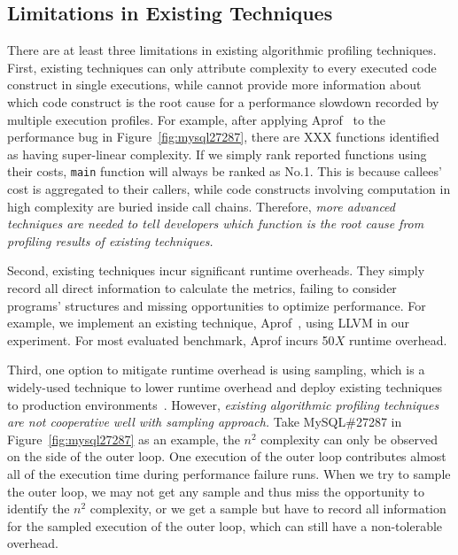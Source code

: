 \subsection{Limitations in Existing Techniques}
\label{subsec:existing}


%
There are at least three limitations in existing algorithmic profiling techniques. 
%
First, existing techniques can only 
attribute complexity to every executed code construct
in single executions, 
while cannot provide more information about 
which code construct is the root cause 
for a performance slowdown recorded by multiple 
execution profiles. 
For example, after applying Aprof~\cite{Aprof1,Aprof2} 
to the performance bug in Figure~\ref{fig:mysql27287}, 
there are {\color{red} XXX} functions identified 
as having super-linear complexity. 
If we simply rank reported functions using their costs, 
\texttt{main} function will always be ranked as No.1. 
This is because callees' cost is aggregated to their callers, 
while code constructs involving computation in high complexity 
are buried inside call chains.
Therefore, \emph{
more advanced techniques are needed to tell developers 
which function is the root cause from profiling results of existing techniques. 
}


Second, existing techniques incur significant runtime overheads. 
They simply record all direct information to calculate the metrics, 
failing to consider programs' structures and missing opportunities to optimize performance.
For example, we implement an existing technique, Aprof~\cite{Aprof1,Aprof2}, 
using LLVM in our experiment. 
For most evaluated benchmark, Aprof incurs 50$X$ runtime overhead.


Third, one option to mitigate runtime overhead is using
sampling, which is a widely-used technique to lower runtime overhead 
and deploy existing techniques to production 
environments~\cite{SongOOPSLA2014,liblit03,liblit05,CCI}. 
However, \emph{existing algorithmic profiling techniques are not cooperative well with
sampling approach.} 
Take MySQL\#27287 in Figure~\ref{fig:mysql27287} as an example,
the $n^2$ complexity can only be observed on the side of the outer loop. 
One execution of the outer loop contributes almost all of 
the execution time during performance failure runs. 
When we try to sample the outer loop, 
we may not get any sample and thus miss the opportunity to 
identify the $n^2$ complexity, or we get a sample but have to 
record all 
information for the sampled execution of the outer loop, 
which can still  have a non-tolerable overhead. 


